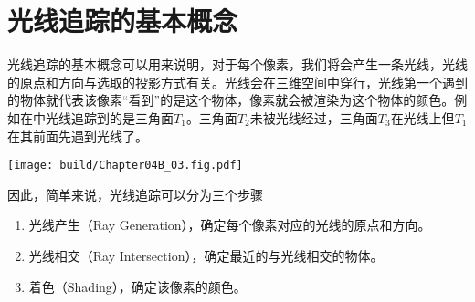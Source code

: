 \section{光线追踪的基本概念}

光线追踪的基本概念可以用来说明，对于每个像素，我们将会产生一条光线，光线的原点和方向与选取的投影方式有关。光线会在三维空间中穿行，光线第一个遇到的物体就代表该像素“看到”的是这个物体，像素就会被渲染为这个物体的颜色。例如在中光线追踪到的是三角面$T_1$。三角面$T_2$未被光线经过，三角面$T_3$在光线上但$T_1$在其前面先遇到光线了。
\begin{Figure}[光线追踪的基本概念]
    \texttt{[image: build/Chapter04B\_03.fig.pdf]}
\end{Figure}

因此，简单来说，光线追踪可以分为三个步骤
\begin{enumerate}
    \item 光线产生（Ray Generation），确定每个像素对应的光线的原点和方向。
    \item 光线相交（Ray Intersection），确定最近的与光线相交的物体。
    \item 着色（Shading），确定该像素的颜色。
\end{enumerate}